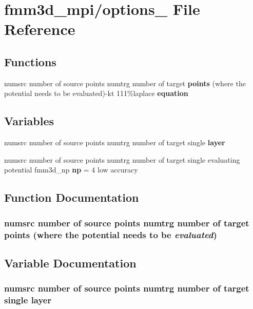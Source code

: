 \section{fmm3d\_\-mpi/options\_ File Reference}
\label{options__0}


\subsection*{Functions}
\begin{CompactItemize}
\item 
numsrc number of source points numtrg number of target {\bf points} (where the potential needs to be evaluated)-kt 111\%laplace {\bf equation}
\end{CompactItemize}
\subsection*{Variables}
\begin{CompactItemize}
\item 
numsrc number of source points numtrg number of target single {\bf layer}
\item 
numsrc number of source points numtrg number of target single evaluating potential fmm3d\_\-np {\bf np} = 4 low accuracy
\end{CompactItemize}


\subsection{Function Documentation}
\subsubsection{\setlength{\rightskip}{0pt plus 5cm}numsrc number of source points numtrg number of target points (where the potential needs to be {\em evaluated})}\label{options__0_c3a119b1dd39dc8cafe3902a2c4857ac_c3a119b1dd39dc8cafe3902a2c4857ac}




\subsection{Variable Documentation}
\subsubsection{\setlength{\rightskip}{0pt plus 5cm}numsrc number of source points numtrg number of target single {\bf layer}}\label{options__0_f56b53e412e87751f665cb9f9061e50b_f56b53e412e87751f665cb9f9061e50b}




